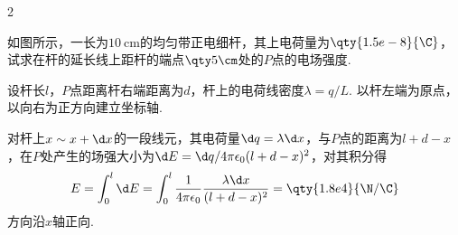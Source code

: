 \begin{paracol}{2}
\begin{problem}
    如图所示，一长为$\qty{10}{\cm}$的均匀带正电细杆，其上电荷量为$\qty{1.5e-8}{\C}$，试求在杆的延长线上距杆的端点$\qty5{\cm}$处的$P$点的电场强度.
    \switchcolumn\vspace*{\fill}\centering
    \vspace*{\fill}
\end{problem}
\end{paracol}
\begin{solution}
设杆长$l$，$P$点距离杆右端距离为$d$，杆上的电荷线密度$\lambda=q/L$. 以杆左端为原点，以向右为正方向建立坐标轴.

对杆上$x\sim x+\d x$的一段线元，其电荷量$\d q=\lambda\d x$，与$P$点的距离为$l+d-x$，在$P$处产生的场强大小为$\d E=\d q/4\pi\epsilon_0(l+d-x)^2$，对其积分得
\[E=\int_0^l\d E=\int_0^l\frac{1}{4\pi\epsilon_0}\frac{\lambda\d x}{(l+d-x)^2}=\qty{1.8e4}{\N/\C}\]
方向沿$x$轴正向.
\end{solution}

